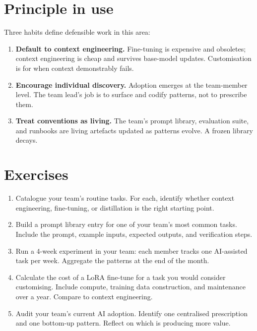 \documentclass[
  letterpaper,
  11pt]{scrbook}
\begin{document}
\section{Principle in use}\label{principle-in-use-12}

Three habits define defensible work in this area:

\begin{enumerate}
\def\labelenumi{\arabic{enumi}.}
\item
  \textbf{Default to context engineering.} Fine-tuning is expensive and
  obsoletes; context engineering is cheap and survives base-model
  updates. Customisation is for when context demonstrably fails.
\item
  \textbf{Encourage individual discovery.} Adoption emerges at the
  team-member level. The team lead's job is to surface and codify
  patterns, not to prescribe them.
\item
  \textbf{Treat conventions as living.} The team's prompt library,
  evaluation suite, and runbooks are living artefacts updated as
  patterns evolve. A frozen library decays.
\end{enumerate}

\section{Exercises}\label{exercises-12}

\begin{enumerate}
\def\labelenumi{\arabic{enumi}.}
\item
  Catalogue your team's routine tasks. For each, identify whether
  context engineering, fine-tuning, or distillation is the right
  starting point.
\item
  Build a prompt library entry for one of your team's most common tasks.
  Include the prompt, example inputs, expected outputs, and verification
  steps.
\item
  Run a 4-week experiment in your team: each member tracks one
  AI-assisted task per week. Aggregate the patterns at the end of the
  month.
\item
  Calculate the cost of a LoRA fine-tune for a task you would consider
  customising. Include compute, training data construction, and
  maintenance over a year. Compare to context engineering.
\item
  Audit your team's current AI adoption. Identify one centralised
  prescription and one bottom-up pattern. Reflect on which is producing
  more value.
\end{enumerate}
\end{document}
